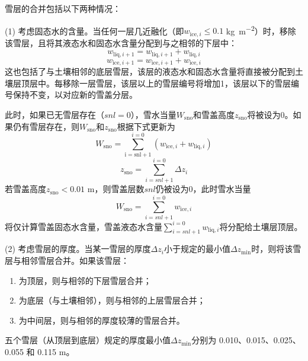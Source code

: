 雪层的合并包括以下两种情况：

(1) 考虑固态水的含量。当任何一层几近融化（即$w_{\mathrm{ice},i} \leqslant 0.1$ \unit{kg.m^{-2}}）时，移除该雪层，且将其液态水和固态水含量分配到与之相邻的下层中：
\begin{equation}
  w_{\mathrm{liq},i+1} = w_{\mathrm{liq},i+1} + w_{\mathrm{liq},i}
\end{equation}
\begin{equation}
  w_{\mathrm{ice},i+1} = w_{\mathrm{ice},i+1} + w_{\mathrm{ice},i}
\end{equation}
这也包括了与土壤相邻的底层雪层，该层的液态水和固态水含量将直接被分配到土壤层顶层中。每移除一层雪层，该层以上的雪层编号将增加1，该层以下的雪层编号保持不变，以对应新的雪盖分层。

此时，如果已无雪层存在（$snl=0$），雪水当量$W_{\mathrm{sno}}$和雪盖高度$z_{\mathrm{sno}}$将被设为0。如果仍有雪层存在，则$W_{\mathrm{sno}}$和$z_{\mathrm{sno}}$根据下式更新为
\begin{equation}
  W_{\mathrm{sno}} = \sum_{\mathrm{i=snl+1}}^{i=0}\left(w_{\mathrm{ice},i}+w_{\mathrm{liq},i}\right)
\end{equation}
\begin{equation}
  z_{\mathrm{sno}} = \sum_{i=snl+1}^{i=0} \Delta z_i
\end{equation}
若雪盖高度$z_{\mathrm{sno}} < 0.01$ \unit{m}，则雪盖层数$snl$仍被设为0，此时雪水当量
$$W_{\mathrm{sno}}=\sum_{i=snl+1}^{i=0} w_{\mathrm{ice},i}$$
将仅计算雪盖固态水含量，雪盖液态水含量$\sum_{i=snl+1}^{i=0} w_{\mathrm{liq},i}$将分配给土壤层顶层。

(2) 考虑雪层的厚度。当某一雪层的厚度$\Delta z_i$小于规定的最小值$\Delta z_{\mathrm{min}}$时，则将该雪层与相邻雪层合并。如果该雪层：
\begin{enumerate}
  \item 为顶层，则与相邻的下层雪层合并；
  \item 为底层（与土壤相邻），则与相邻的上层雪层合并；
  \item 为中间层，则与相邻的厚度较薄的雪层合并。
\end{enumerate}

五个雪层（从顶层到底层）规定的厚度最小值$\Delta z_{\mathrm{min}}$分别为 0.010、0.015、0.025、0.055 和 0.115 \unit{m}。

